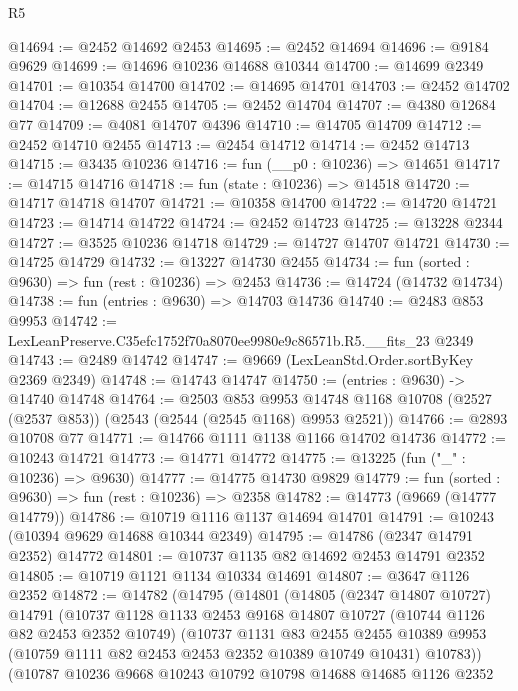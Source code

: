 \begin{lexlean}{R5}
\begin{coremodule}
@14694 := @2452 @14692 @2453
@14695 := @2452 @14694
@14696 := @9184 @9629
@14699 := @14696 @10236 @14688 @10344
@14700 := @14699 @2349
@14701 := @10354 @14700
@14702 := @14695 @14701
@14703 := @2452 @14702
@14704 := @12688 @2455
@14705 := @2452 @14704
@14707 := @4380 @12684 @77
@14709 := @4081 @14707 @4396
@14710 := @14705 @14709
@14712 := @2452 @14710 @2455
@14713 := @2454 @14712
@14714 := @2452 @14713
@14715 := @3435 @10236
@14716 := fun (__p0 : @10236) => @14651
@14717 := @14715 @14716
@14718 := fun (state : @10236) => @14518
@14720 := @14717 @14718 @14707
@14721 := @10358 @14700
@14722 := @14720 @14721
@14723 := @14714 @14722
@14724 := @2452 @14723
@14725 := @13228 @2344
@14727 := @3525 @10236 @14718
@14729 := @14727 @14707 @14721
@14730 := @14725 @14729
@14732 := @13227 @14730 @2455
@14734 := fun (sorted : @9630) => fun (rest : @10236) => @2453
@14736 := @14724 (@14732 @14734)
@14738 := fun (entries : @9630) => @14703 @14736
@14740 := @2483 @853 @9953
@14742 := LexLeanPreserve.C35efc1752f70a8070ee9980e9c86571b.R5.__fits_23 @2349
@14743 := @2489 @14742
@14747 := @9669 (LexLeanStd.Order.sortByKey @2369 @2349)
@14748 := @14743 @14747
@14750 := (entries : @9630) -> @14740 @14748
@14764 := @2503
    @853
    @9953
    @14748
    @1168
    @10708
    (@2527 (@2537 @853))
    (@2543 (@2544 (@2545 @1168) @9953 @2521))
@14766 := @2893 @10708 @77
@14771 := @14766 @1111 @1138 @1166 @14702 @14736
@14772 := @10243 @14721
@14773 := @14771 @14772
@14775 := @13225 (fun ("_" : @10236) => @9630)
@14777 := @14775 @14730 @9829
@14779 := fun (sorted : @9630) => fun (rest : @10236) => @2358
@14782 := @14773 (@9669 (@14777 @14779))
@14786 := @10719 @1116 @1137 @14694 @14701
@14791 := @10243 (@10394 @9629 @14688 @10344 @2349)
@14795 := @14786 (@2347 @14791 @2352) @14772
@14801 := @10737 @1135 @82 @14692 @2453 @14791 @2352
@14805 := @10719 @1121 @1134 @10334 @14691
@14807 := @3647 @1126 @2352
@14872 := @14782
    (@14795
      (@14801
        (@14805
          (@2347 @14807 @10727)
          @14791
          (@10737
            @1128
            @1133
            @2453
            @9168
            @14807
            @10727
            (@10744 @1126 @82 @2453 @2352 @10749)
            (@10737
              @1131
              @83
              @2455
              @2455
              @10389
              @9953
              (@10759 @1111 @82 @2453 @2453 @2352 @10389 @10749 @10431)
              @10783))
          (@10787
            @10236
            @9668
            @10243
            @10792
            @10798
            @14688
            @14685
            @1126
            @2352

\end{coremodule}
\end{lexlean}
